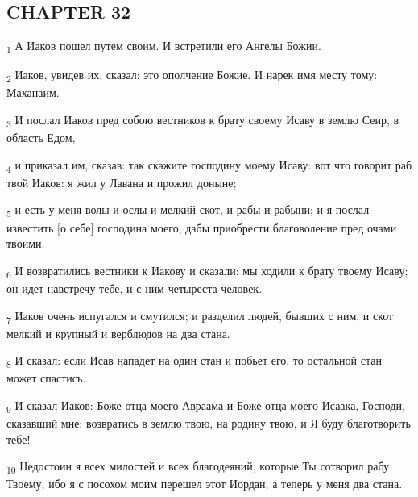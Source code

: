 \subsection{CHAPTER 32}
\begin{tcolorbox}
\textsubscript{1} А Иаков пошел путем своим. И встретили его Ангелы Божии.
\end{tcolorbox}
\begin{tcolorbox}
\textsubscript{2} Иаков, увидев их, сказал: это ополчение Божие. И нарек имя месту тому: Маханаим.
\end{tcolorbox}
\begin{tcolorbox}
\textsubscript{3} И послал Иаков пред собою вестников к брату своему Исаву в землю Сеир, в область Едом,
\end{tcolorbox}
\begin{tcolorbox}
\textsubscript{4} и приказал им, сказав: так скажите господину моему Исаву: вот что говорит раб твой Иаков: я жил у Лавана и прожил доныне;
\end{tcolorbox}
\begin{tcolorbox}
\textsubscript{5} и есть у меня волы и ослы и мелкий скот, и рабы и рабыни; и я послал известить [о себе] господина моего, дабы приобрести благоволение пред очами твоими.
\end{tcolorbox}
\begin{tcolorbox}
\textsubscript{6} И возвратились вестники к Иакову и сказали: мы ходили к брату твоему Исаву; он идет навстречу тебе, и с ним четыреста человек.
\end{tcolorbox}
\begin{tcolorbox}
\textsubscript{7} Иаков очень испугался и смутился; и разделил людей, бывших с ним, и скот мелкий и крупный и верблюдов на два стана.
\end{tcolorbox}
\begin{tcolorbox}
\textsubscript{8} И сказал: если Исав нападет на один стан и побьет его, то остальной стан может спастись.
\end{tcolorbox}
\begin{tcolorbox}
\textsubscript{9} И сказал Иаков: Боже отца моего Авраама и Боже отца моего Исаака, Господи, сказавший мне: возвратись в землю твою, на родину твою, и Я буду благотворить тебе!
\end{tcolorbox}
\begin{tcolorbox}
\textsubscript{10} Недостоин я всех милостей и всех благодеяний, которые Ты сотворил рабу Твоему, ибо я с посохом моим перешел этот Иордан, а теперь у меня два стана.
\end{tcolorbox}
